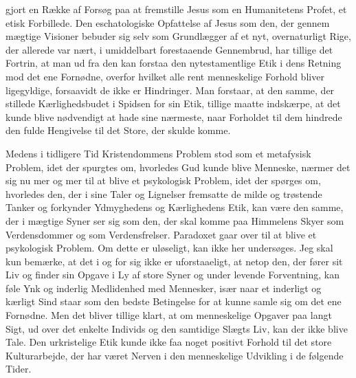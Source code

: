 \documentclass[12pt,a4paper,openany]{book}
\begin{document}
gjort en Række af Forsøg paa at fremstille Jesus som en Humanitetens
Profet, et etisk Forbillede. Den eschatologiske Opfattelse af Jesus
som den, der gennem mægtige Visioner bebuder sig selv som
Grundlægger af et nyt, overnaturligt Rige, der allerede var nært, i
umiddelbart forestaaende Gennembrud, har tillige det Fortrin, at
man ud fra den kan forstaa den nytestamentlige Etik i dens Retning
mod det ene Fornødne, overfor hvilket alle rent menneskelige Forhold
bliver ligegyldige, forsaavidt de ikke er Hindringer. Man forstaar,
at den samme, der stillede Kærlighedsbudet i Spidsen for sin
Etik, tillige maatte indskærpe, at det kunde blive nødvendigt at hade
sine nærmeste, naar Forholdet til dem hindrede den fulde Hengivelse
til det Store, der skulde komme.

Medens i tidligere Tid Kristendommens Problem stod som et metafysisk
Problem, idet der spurgtes om, hvorledes Gud kunde blive
Menneske, nærmer det sig nu mer og mer til at blive et psykologisk
Problem, idet der spørges om, hvorledes den, der i sine Taler og
Lignelser fremsatte de milde og trøstende Tanker og forkynder Ydmyghedens
og Kærlighedens Etik, kan være den samme, der i mægtige
Syner ser sig som den, der skal komme paa Himmelens Skyer
som Verdensdommer og som Verdensfrelser. Paradoxet gaar over til
at blive et psykologisk Problem. Om dette er uløseligt, kan ikke her
undersøges. Jeg skal kun bemærke, at det i og for sig ikke er uforstaaeligt,
at netop den, der fører sit Liv og finder sin Opgave i Ly
af store Syner og under levende Forventning, kan føle Ynk og inderlig
Medlidenhed med Mennesker, især naar et inderligt og kærligt
Sind staar som den bedste Betingelse for at kunne samle sig om det
ene Fornødne. Men det bliver tillige klart, at om menneskelige Opgaver
paa langt Sigt, ud over det enkelte Individs og den samtidige
Slægts Liv, kan der ikke blive Tale. Den urkristelige Etik kunde
ikke faa noget positivt Forhold til det store Kulturarbejde, der har
været Nerven i den menneskelige Udvikling i de følgende Tider.
\end{document}
